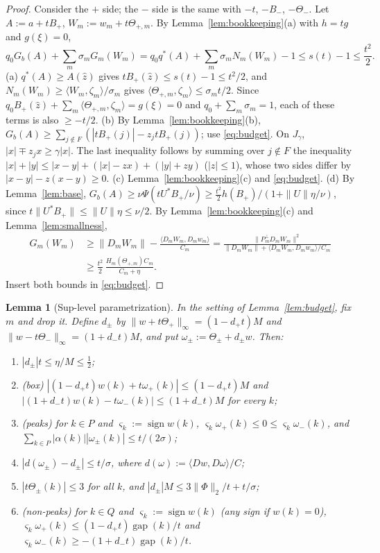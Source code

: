 \documentclass[10pt]{amsart}
\newtheorem{lemma}[theorem]{Lemma}
\theoremstyle{definition}
\theoremstyle{remark}
\newcommand{\sgn}{\operatorname{sign}}
\newcommand{\gap}{\operatorname{gap}}
\newcommand{\zh}{\hat z}
\newcommand{\ip}[2]{\langle #1,#2\rangle}
\begin{document}
\begin{proof}
Consider the $+$ side; the $-$ side is the same with $-t$, $-B_-$,
$-\Theta_-$.  Let $A:=a+tB_+$, $W_m:=w_m+t\Theta_{+,m}$.  By
Lemma~\ref{lem:bookkeeping}(a) with $h=tg$ and $g(\xi)=0$,
\begin{equation}\label{eq:budget}
 q_0G_b(A)+\sum_m\sigma_mG_m(W_m)=q_0q^*(A)+\sum_m\sigma_mN_m(W_m)-1\le
 s(t)-1\le\frac{t^2}2 .
\end{equation}
(a) $q^*(A)\ge A(\zh)$ gives $tB_+(\zh)\le s(t)-1\le t^2/2$, and
$N_m(W_m)\ge\ip{W_m}{\zeta_m}/\sigma_m$ gives $\ip{\Theta_{+,m}}{\zeta_m}\le
\sigma_mt/2$.  Since $q_0B_+(\zh)+\sum_m\ip{\Theta_{+,m}}{\zeta_m}=g(\xi)=0$
and $q_0+\sum_m\sigma_m=1$, each of these terms is also $\ge-t/2$.
(b) By Lemma~\ref{lem:bookkeeping}(b), $G_b(A)\ge\sum_{j\notin F}(|tB_+(j)|-
z_jtB_+(j))$; use \eqref{eq:budget}.  On $J_\gamma$, $|x|\mp z_jx\ge\gamma|x|$.
The last inequality follows by summing over $j\notin F$ the inequality
$|x|+|y|\le|x-y|+(|x|-zx)+(|y|+zy)$ ($|z|\le1$), whose two sides differ by
$|x-y|-z(x-y)\ge0$.
(c) Lemma~\ref{lem:bookkeeping}(c) and \eqref{eq:budget}.
(d) By Lemma~\ref{lem:base}, $G_b(A)\ge\nu\Psi(tU^*B_+/\nu)\ge\frac{t^2}2
h(B_+)/(1+\|U\|\eta/\nu)$, since $t\|U^*B_+\|\le\|U\|\eta\le\nu/2$.  By
Lemma~\ref{lem:bookkeeping}(c) and Lemma~\ref{lem:smallness},
\begin{align*}
 G_m(W_m)&\ge\|D_mW_m\|-\frac{\ip{D_mW_m}{D_mw_m}}{C_m}=
 \frac{\|P^\perp_mD_mW_m\|^2}{\|D_mW_m\|+\ip{D_mW_m}{D_mw_m}/C_m}\\
 &\ge\frac{t^2}2\,\frac{H_m(\Theta_{+,m})C_m}{C_m+\eta}.
\end{align*}
Insert both bounds in \eqref{eq:budget}.
\end{proof}

\begin{lemma}[Sup-level parametrization]\label{lem:suplevel}
In the setting of Lemma~\ref{lem:budget}, fix $m$ and drop it.  Define
$d_\pm$ by $\|w+t\Theta_+\|_\infty=(1-d_+t)M$ and $\|w-t\Theta_-\|_\infty=
(1+d_-t)M$, and put $\omega_\pm:=\Theta_\pm+d_\pm w$.  Then:
\begin{enumerate}
\item[(a)] $|d_\pm|t\le\eta/M\le\frac12$;
\item[(b)] \textup{(box)} $|(1-d_+t)w(k)+t\omega_+(k)|\le(1-d_+t)M$ and
$|(1+d_-t)w(k)-t\omega_-(k)|\le(1+d_-t)M$ for every $k$;
\item[(c)] \textup{(peaks)} for $k\in P$ and $\varsigma_k:=\sgn w(k)$,
$\varsigma_k\omega_+(k)\le0\le\varsigma_k\omega_-(k)$, and
$\sum_{k\in P}|\alpha(k)||\omega_\pm(k)|\le t/(2\sigma)$;
\item[(d)] $|d(\omega_\pm)-d_\pm|\le t/\sigma$, where
$d(\omega):=\ip{Dw}{D\omega}/C$;
\item[(e)] $|t\Theta_\pm(k)|\le3$ for all $k$, and $|d_\pm|M\le3\|\Phi\|_2/t+
t/\sigma$;
\item[(f)] \textup{(non-peaks)} for $k\in Q$ and $\varsigma_k:=\sgn w(k)$ (any
sign if $w(k)=0$), $\varsigma_k\omega_+(k)\le(1-d_+t)\gap(k)/t$ and
$\varsigma_k\omega_-(k)\ge-(1+d_-t)\gap(k)/t$.
\end{enumerate}
\end{lemma}
\end{document}
